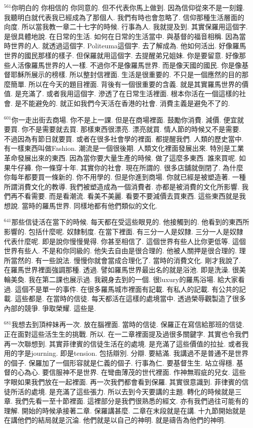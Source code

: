 \documentclass{book}
\begin{document}
$^{561}$你明白的 你相信的 你同意的.
但不代表你馬上做到.
因為信仰從來不是一刻鐘.
我聽明白就代表我已經成為了那個人.
我們有時也會忽略了.
信仰那種生活層面的向度.
所以當我教一章二十七字的時候.
行事為人.
我就提及到.
其實保羅用這個字.
是很具體地說.
在日常的生活.
如何在日常的生活當中.
與基督的福音相稱.
因為當時世界的人.
就透過這個字.
Politeuma這個字.
去了解成為.
他如何活出.
好像羅馬世界的國民那樣的樣子.
但保羅就用這個字.
去提醒弟兄姐妹.
你是要留意.
好像那些人活像羅馬世界的人一樣.
不過你不是像羅馬世界.
而是像天國的國民.
你是像基督耶穌所展示的榜樣.
所以整封信裡面.
生活是很重要的.
不只是一個應然的目的那麼簡單.
所以在今天的題目裡面.
背後有一個很重要的含義.
就是其實羅馬世界的價值.
是充滿了.
或者我用這個字.
滲透了在日常生活裡面.
根本你活在一個這樣的社會.
是不能避免的.
就正如我們今天活在香港的社會.
消費主義是避免不了的.

$^{601}$你一走出街去商場.
你不是上一課.
但是在商場裡面.
鼓勵你消費.
減價.
便宜就要買.
你不是需要就去買.
那樣東西很漂亮.
漂亮就買.
情人節的時候又不是需要.
不過因為有節日就要買.
或者在很多社會學的裡面.
都提醒我們.
人類的歷史當中.
有一樣東西叫做Fashion.
潮流是一個很後期.
人類文化裡面發展出來.
特別是工業革命發展出來的東西.
因為當你要大量生產的時候.
做了這麼多東西.
誰來買呢.
如果牛仔褲.
你一條穿十年.
其實你的社會.
現在所謂的.
很多店舖就倒閉了.
為什麼你每年都要買一條新的.
你不用學的.
但是你進到商場.
你就已經是被塑造著.
一種所謂消費文化的教導.
我們被塑造成為一個消費者.
亦都是被消費的文化所影響.
我們再不看需要.
而是看潮流.
看美不美麗.
看要不要減價去買東西.
這些東西就是我想說.
當時的羅馬世界.
同樣地都有他們類似的文化.

$^{641}$那些信徒活在當下的時候.
每天都在受這些眼見的.
他接觸到的.
他看到的東西所影響的.
包括什麼呢.
奴隸制度.
在當下裡面.
有三分一人是奴隸.
三分一人是奴隸代表什麼呢.
即是說你慢慢覺得.
你甚至相信了.
這個世界有些人比你更低等.
這個世界有些人.
不是和你同級的.
他失去自由是很合理的.
他被人關押是很合理的.
理所當然的.
有一些說法.
慢慢你就會當成合理化了.
當時的消費文化.
剛才我說了.
在羅馬世界裡面強調那種.
透過.
譬如羅馬世界最出名的就是浴池.
即是洗澡.
很美輪美奐.
我在第二課也展示過.
我親身去到的一個.
很luxury的羅馬浴場.
給大家看過.
這個不是單一的事件.
在很多羅馬城市裡面有記載.
有私人的記載.
有公共的記載.
這些都是.
在當時的信徒.
每天都活在這樣的處境當中.
透過榮辱觀製造了很多內部的競爭.
爭取榮耀.
這些是.

$^{681}$我想去到頂梓妹再一次.
放在腦裡面.
當時的信徒.
保羅正在寫信給那班的信徒.
正在面對這些活生生的挑戰.
所以.
在一二章裡面提及過很多關鍵字.
其實也令我們再一次聯想到.
其實菲律賓的信徒生活在的處境.
是充滿了這些價值的拉扯.
或者我用的字是journing.
即是tension.
包括辯別.
分辯.
要結滿.
我講過不是普通不是世界的個子.
保羅加了一個形容就是仁義的個子.
行事為仁.
要基督生生.
站立得穩.
基督的心為心.
要信服神不是世界.
在彎曲薄茂的世代裡面.
作神無瑕疵的兒女.
這些字眼如果我們放在一起裡面.
再一次我們都會看到保羅.
其實很意識到.
菲律賓的信徒所活的處境.
是充滿了這些張力.
所以去到今天要講的主題.
轉化的時候就是三章.
我們先看一至十節裡面.
這裡部分是我們很熟悉的經文.
亦有我們過往可能有的理解.
開始的時候承接著二章.
保羅講甚麼.
二章在末段就是在講.
十九節開始就是在講他們的結局就是沉淪.
他們就是以自己的神明.
就是禱告為他們的神明.
\end{document}
